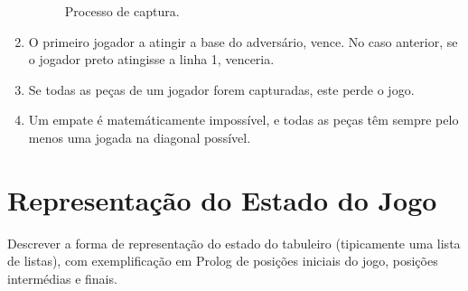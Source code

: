 \documentclass[15pt,a4paper]{article}
\begin{document}
\begin{enumerate}
\begin{figure}[H]
\begin{center}
\hspace{10px}
\caption{Processo de captura.}
\label{fig:2}
\end{center}
\end{figure}

\item O primeiro jogador a atingir a base do adversário, vence. No caso anterior, se o jogador preto atingisse a linha 1, venceria.
\item Se todas as peças de um jogador forem capturadas, este perde o jogo.
\item Um empate é matemáticamente impossível, e todas as peças têm sempre pelo menos uma jogada na diagonal possível.

\end{enumerate}

\newpage
\section{Representação do Estado do Jogo}
Descrever a forma de representação do estado do tabuleiro (tipicamente uma lista de listas), com exemplificação em Prolog de posições iniciais do jogo, posições intermédias e finais.
\end{document}
